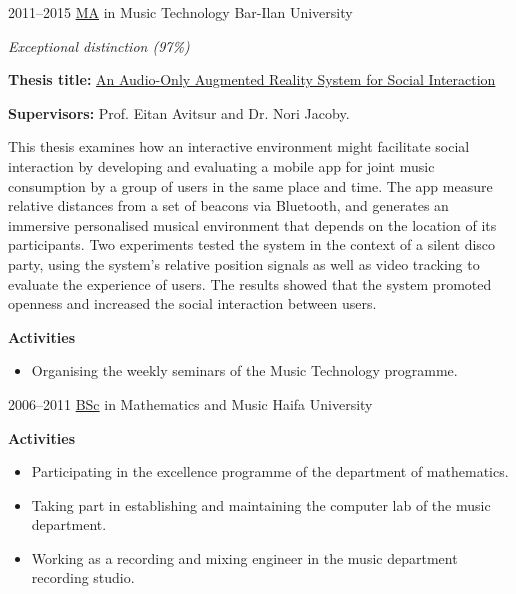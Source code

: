 \documentclass[]{friggeri-cv}
\begin{document}
\begin{entrylist}

    \entry
    {2011--2015}
    {\href{http://www.tomgurion.me/pdfs/MA.pdf}{MA} in Music Technology}
    {Bar-Ilan University}
    {
      \textit{Exceptional distinction (97\%)}

      \textbf{Thesis title:} \href{http://www.tomgurion.me/pdfs/Gurion - An Audio-Only Augmented Reality System for Social Interaction.pdf}{An Audio-Only Augmented Reality System for Social Interaction}

      \textbf{Supervisors:} Prof. Eitan Avitsur and Dr. Nori Jacoby.

      This thesis examines how an interactive environment might facilitate social interaction by developing and evaluating a mobile app for joint music consumption by a group of users in the same place and time.
      The app measure relative distances from a set of beacons via Bluetooth, and generates an immersive personalised musical environment that depends on the location of its participants.
      Two experiments tested the system in the context of a silent disco party, using the system's relative position signals as well as video tracking to evaluate the experience of users.
      The results showed that the system promoted openness and increased the social interaction between users.

      \textbf{Activities}
      \begin{itemize}
        \item
          Organising the weekly seminars of the Music Technology programme.
      \end{itemize}
    }

\end{entrylist}
\begin{entrylist}

    \entry
    {2006--2011}
    {\href{http://www.tomgurion.me/pdfs/BSc.pdf}{BSc} in Mathematics and Music}
    {Haifa University}
    {
      \textbf{Activities}
      \begin{itemize}
        \item
          Participating in the excellence programme of the department of mathematics.
        \item
          Taking part in establishing and maintaining the computer lab of the music department.
        \item
          Working as a recording and mixing engineer in the music department recording studio.
      \end{itemize}
    }

\end{entrylist}
\end{document}
